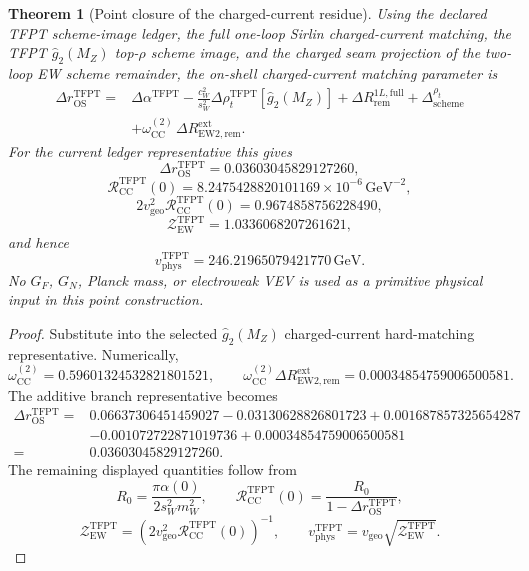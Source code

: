 \documentclass[11pt,a4paper]{article}
\newtheorem{theorem}{Theorem}[section]
\theoremstyle{definition}
\theoremstyle{remark}
\newcommand{\omegaCCEW}{\omega_{\mathrm{CC}}^{(2)}}
\newcommand{\vgeo}{v_{\mathrm{geo}}}
\begin{document}
\begin{theorem}[Point closure of the charged-current residue]
\label{thm:charged-current-point-closure}
Using the declared TFPT scheme-image ledger, the full one-loop Sirlin charged-current matching, the
TFPT $\hat g_2(M_Z)$ top-$\rho$ scheme image, and the charged seam projection of the two-loop EW
scheme remainder, the on-shell charged-current matching parameter is
\begin{equation}
\label{eq:tfpt-point-closed-deltar}
\begin{aligned}
\Delta r_{\mathrm{OS}}^{\mathrm{TFPT}}
={}&
\Delta\alpha^{\mathrm{TFPT}}
-
\frac{c_W^2}{s_W^2}\Delta\rho_t^{\mathrm{TFPT}}[\hat g_2(M_Z)]
+
\Delta R_{\mathrm{rem}}^{1L,\mathrm{full}}
+
\Delta_{\mathrm{scheme}}^{\rho_t}
\\
&+
\omegaCCEW\,
\Delta R_{\mathrm{EW2},\mathrm{rem}}^{\mathrm{ext}}.
\end{aligned}
\end{equation}
For the current ledger representative this gives
\[
\Delta r_{\mathrm{OS}}^{\mathrm{TFPT}}
=
0.03603045829127260,
\]
\[
\mathcal R_{\mathrm{CC}}^{\mathrm{TFPT}}(0)
=
8.2475428820101169\times10^{-6}\,\mathrm{GeV}^{-2},
\]
\[
2\vgeo^2\mathcal R_{\mathrm{CC}}^{\mathrm{TFPT}}(0)
=
0.9674858756228490,
\]
\[
\mathcal Z_{\mathrm{EW}}^{\mathrm{TFPT}}
=
1.0336068207261621,
\]
and hence
\[
v_{\mathrm{phys}}^{\mathrm{TFPT}}
=
246.21965079421770\,\mathrm{GeV}.
\]
No $G_F$, $G_N$, Planck mass, or electroweak VEV is used as a primitive physical input in this point
construction.
\end{theorem}

\begin{proof}
Substitute  into the selected $\hat g_2(M_Z)$ charged-current
hard-matching representative. Numerically,
\[
\omegaCCEW=0.59601324532821801521,
\qquad
\omegaCCEW\Delta R_{\mathrm{EW2},\mathrm{rem}}^{\mathrm{ext}}
=
0.00034854759006500581.
\]
The additive branch representative becomes
\[
\begin{aligned}
\Delta r_{\mathrm{OS}}^{\mathrm{TFPT}}
={}&
0.06637306451459027
-0.03130628826801723
+0.001687857325654287
\\
&-0.001072722871019736
+0.00034854759006500581
\\
={}&
0.03603045829127260.
\end{aligned}
\]
The remaining displayed quantities follow from
\[
R_0=\frac{\pi\alpha(0)}{2s_W^2m_W^2},
\qquad
\mathcal R_{\mathrm{CC}}^{\mathrm{TFPT}}(0)=\frac{R_0}{1-\Delta r_{\mathrm{OS}}^{\mathrm{TFPT}}},
\]
\[
\mathcal Z_{\mathrm{EW}}^{\mathrm{TFPT}}
=
\left(2\vgeo^2\mathcal R_{\mathrm{CC}}^{\mathrm{TFPT}}(0)\right)^{-1},
\qquad
v_{\mathrm{phys}}^{\mathrm{TFPT}}
=
\vgeo\sqrt{\mathcal Z_{\mathrm{EW}}^{\mathrm{TFPT}}}.
\]
\end{proof}
\end{document}
